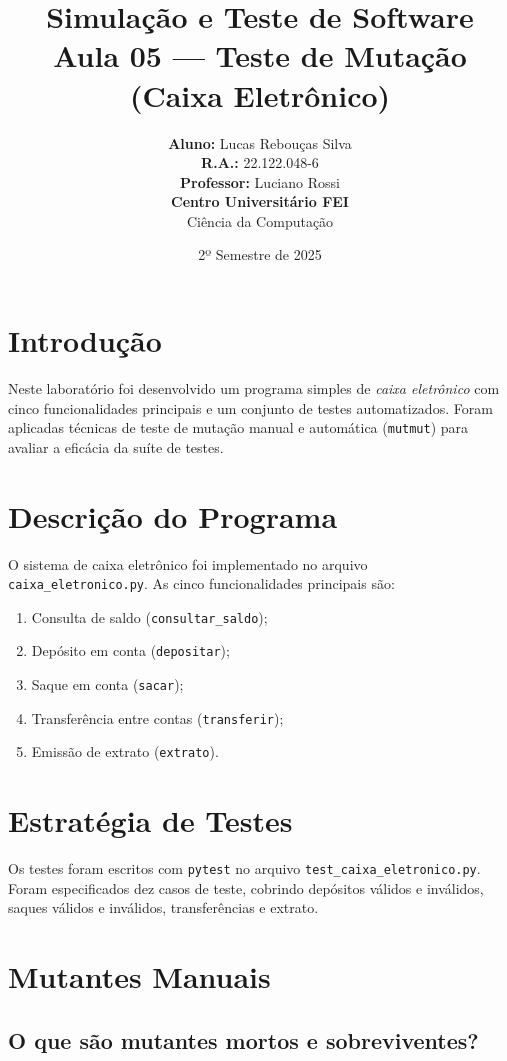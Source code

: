 \documentclass[11pt,a4paper]{article}
\title{
    {\Large \textbf{Simulação e Teste de Software}} \\
    {\Large \textbf{Aula 05 --- Teste de Mutação (Caixa Eletrônico)}}
}
\author{
    \textbf{Aluno:} Lucas Rebouças Silva \\
    \textbf{R.A.:} 22.122.048-6 \\[0.3cm]
    \textbf{Professor:} Luciano Rossi \\
    \textbf{Centro Universitário FEI} \\
    Ciência da Computação
}
\date{2º Semestre de 2025}
\begin{document}
\maketitle

\newpage
\tableofcontents
\newpage

\section{Introdução}

Neste laboratório foi desenvolvido um programa simples de \emph{caixa eletrônico}
com cinco funcionalidades principais e um conjunto de testes automatizados.
Foram aplicadas técnicas de teste de mutação manual e automática (\texttt{mutmut})
para avaliar a eficácia da suíte de testes.

\section{Descrição do Programa}

O sistema de caixa eletrônico foi implementado no arquivo
\texttt{caixa\_eletronico.py}. As cinco funcionalidades principais são:

\begin{enumerate}
  \item Consulta de saldo (\texttt{consultar\_saldo});
  \item Depósito em conta (\texttt{depositar});
  \item Saque em conta (\texttt{sacar});
  \item Transferência entre contas (\texttt{transferir});
  \item Emissão de extrato (\texttt{extrato}).
\end{enumerate}

\section{Estratégia de Testes}

Os testes foram escritos com \texttt{pytest} no arquivo
\texttt{test\_caixa\_eletronico.py}. Foram especificados dez casos de teste,
cobrindo depósitos válidos e inválidos, saques válidos e inválidos,
transferências e extrato.

\section{Mutantes Manuais}

\subsection*{O que são mutantes mortos e sobreviventes?}
\end{document}
